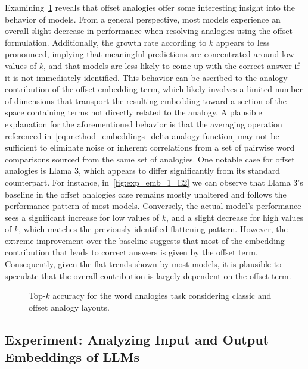 Examining~\cref{fig:exp_emb_1_E} reveals that offset analogies offer some interesting insight into the behavior of models.
From a general perspective, most models experience an overall slight decrease in performance when resolving analogies using the offset formulation.
Additionally, the growth rate according to $k$ appears to less pronounced, implying that meaningful predictions are concentrated around low values of $k$, and that models are less likely to come up with the correct answer if it is not immediately identified.
This behavior can be ascribed to the analogy contribution of the offset embedding term, which likely involves a limited number of dimensions that transport the resulting embedding toward a section of the space containing terms not directly related to the analogy.
A plausible explanation for the aforementioned behavior is that the averaging operation referenced in~\cref{eq:method_embeddings_delta-analogy-function} may not be sufficient to eliminate noise or inherent correlations from a set of pairwise word comparisons sourced from the same set of analogies.
One notable case for offset analogies is Llama 3, which appears to differ significantly from its standard counterpart.
For instance, in~\cref{fig:exp_emb_1_E2} we can observe that Llama 3's baseline in the offset analogies case remains mostly unaltered and follows the performance pattern of most models.
Conversely, the actual model's performance sees a significant increase for low values of $k$, and a slight decrease for high values of $k$, which matches the previously identified flattening pattern.
However, the extreme improvement over the baseline suggests that most of the embedding contribution that leads to correct answers is given by the offset term.
Consequently, given the flat trends shown by most models, it is plausible to speculate that the overall contribution is largely dependent on the offset term.

\begin{figure}[t!]
    \centering
    \caption{Top-$k$ accuracy for the word analogies task considering classic and offset analogy layouts.}
    \label{fig:exp_emb_1_E}
\end{figure}

\subsection{Experiment: Analyzing Input and Output \texorpdfstring{\linebreak}{} Embeddings of LLMs}\label{ssec:exp_emb_exp2}

